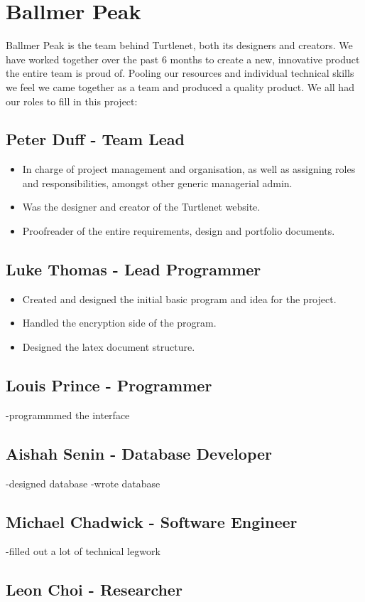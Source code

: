 \section{Ballmer Peak}
Ballmer Peak is the team behind Turtlenet, both its designers and creators.
We have worked together over the past 6 months to create a new, innovative 
product the entire team is proud of. Pooling our resources and individual
technical skills we feel we came together as a team and produced a quality
product. We all had our roles to fill in this project:

\subsection{Peter Duff - Team Lead}
\begin{itemize}
\item In charge of project management and organisation, as well as assigning roles and 
responsibilities, amongst other generic managerial admin.
\item Was the designer and creator of the Turtlenet website.
\item Proofreader of the entire requirements, design and portfolio documents.
\end{itemize}

\subsection{Luke Thomas - Lead Programmer}
\begin{itemize}
\item Created and designed the initial basic program and idea for the project.
\item Handled the encryption side of the program.
\item Designed the latex document structure.
\end{itemize}

\subsection{Louis Prince - Programmer}
-programmmed the interface

\subsection{Aishah Senin - Database Developer}
-designed database
-wrote database

\subsection{Michael Chadwick - Software Engineer}
-filled out a lot of technical legwork

\subsection{Leon Choi - Researcher}
